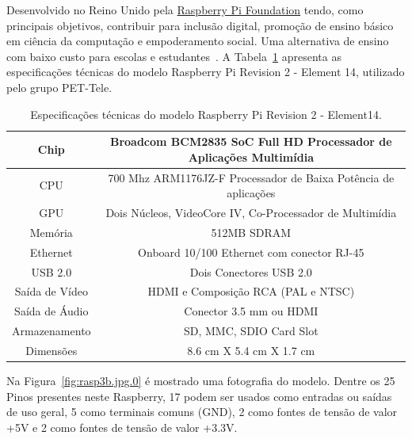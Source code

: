 \documentclass[12pt,a4paper,oneside]{book}
\begin{document}
Desenvolvido no Reino Unido pela \href{https://www.raspberrypi.org/}{Raspberry Pi Foundation} tendo, como principais objetivos, contribuir para inclusão digital, promoção de ensino básico em ciência da computação e empoderamento social. Uma alternativa de ensino com baixo custo para escolas e estudantes~\cite{url:raspberry_wiki}. A Tabela~\ref{tab:Especificacoes} apresenta as especificações técnicas do modelo Raspberry Pi Revision 2 - Element 14, utilizado pelo grupo PET-Tele. 
%
\begin{table}[!htbp]
    \centering
    \begin{tabular}{ |c|c| } 
        \hline
        Chip & Broadcom BCM2835 SoC Full HD Processador de Aplicações Multimídia\\
        \hline
        CPU & 700 Mhz ARM1176JZ-F Processador de Baixa Potência de aplicações \\
        \hline
        GPU & Dois Núcleos, VideoCore IV, Co-Processador de Multimídia \\ 
        \hline
        Memória & 512MB SDRAM  \\
        \hline
        Ethernet & Onboard 10/100 Ethernet com conector RJ-45 \\
        \hline
        USB 2.0 & Dois Conectores USB 2.0 \\ 
        \hline
        Saída de Vídeo & HDMI e Composição RCA (PAL e NTSC) \\ 
        \hline
        Saída de Áudio & Conector 3.5 mm ou HDMI \\
        \hline
        Armazenamento & SD, MMC, SDIO Card Slot \\
        \hline
        Dimensões & 8.6 cm X 5.4 cm X 1.7 cm \\ 
        \hline
    \end{tabular}
    \caption{Especificações técnicas do modelo Raspberry Pi Revision 2 - Element14.}
    \label{tab:Especificacoes}
\end{table}

\pagebreak

Na Figura~\ref{fig:rasp3b.jpg.0} é mostrado uma fotografia do modelo. 
Dentre os 25 Pinos presentes neste Raspberry, 17 podem ser usados como entradas ou saídas de uso geral, 5 como terminais comuns (GND), 2 como fontes de tensão de valor +5V e 2 como fontes de tensão de valor +3.3V. 
\end{document}
